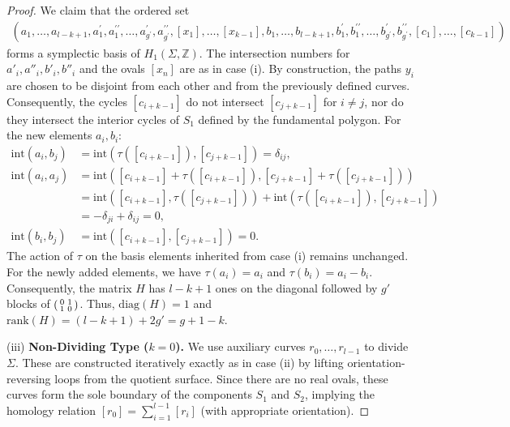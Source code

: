 \documentclass[11pt,a4paper]{article}
\theoremstyle{definition}
\newcommand{\Z}{\mathds{Z}}
\begin{document}
\begin{proof}
We claim that the ordered set
\begin{eqnarray*}
	\left(
	a_1, \ldots, a_{l-k+1}, 
	a^{\prime}_1, a^{\prime \prime}_1, \ldots, a^{\prime}_{g^{\prime}}, a^{\prime \prime}_{g^{\prime}}, 
	[x_1], \dots, [x_{k-1}], 
	b_1, \ldots, b_{l-k+1}, 
	b^{\prime}_1, b^{\prime \prime}_1, \ldots, b^{\prime}_{g^{\prime}}, b^{\prime \prime}_{g^{\prime}}, 
	[c_1], \dots, [c_{k-1}]
	\right)
\end{eqnarray*}
forms a symplectic basis of $H_1(\Sigma, \Z)$. The intersection numbers for $a'_i, a''_i, b'_i, b''_i$ and the ovals $[x_n]$ are as in case (i). By construction, the paths $y_i$ are chosen to be disjoint from each other and from the previously defined curves. Consequently, the cycles $[c_{i+k-1}]$ do not intersect $[c_{j+k-1}]$ for $i \neq j$, nor do they intersect the interior cycles of $S_1$ defined by the fundamental polygon. For the new elements $a_i, b_i$:
\begin{align*}
	\mathrm{int}(a_i, b_j) &= \mathrm{int}(\tau([c_{i+k-1}]), [c_{j+k-1}]) = \delta_{ij}, \\
	\mathrm{int}(a_i, a_j) &= \mathrm{int}([c_{i+k-1}] + \tau([c_{i+k-1}]), [c_{j+k-1}] + \tau([c_{j+k-1}])) \\
	&= \mathrm{int}([c_{i+k-1}], \tau([c_{j+k-1}])) + \mathrm{int}(\tau([c_{i+k-1}]), [c_{j+k-1}]) \\
	&= -\delta_{ji} + \delta_{ij} = 0, \\
	\mathrm{int}(b_i, b_j) &= \mathrm{int}([c_{i+k-1}], [c_{j+k-1}]) = 0.
\end{align*}
The action of $\tau$ on the basis elements inherited from case (i) remains unchanged. For the newly added elements, we have $\tau(a_i) = a_i$ and $\tau(b_i) = a_i - b_i$. Consequently, the matrix $H$ has $l-k+1$ ones on the diagonal followed by $g'$ blocks of $\begin{psmallmatrix} 0 & 1 \\ 1 & 0 \end{psmallmatrix}$. Thus, $\mathrm{diag}(H) = 1$ and $\mathrm{rank}(H) = (l-k+1) + 2g' = g + 1 - k$.

	(iii) \textbf{Non-Dividing Type ($k = 0$).} We use auxiliary curves $r_0, \ldots, r_{l-1}$ to divide $\Sigma$. These are constructed iteratively exactly as in case (ii) by lifting orientation-reversing loops from the quotient surface. Since there are no real ovals, these curves form the sole boundary of the components $S_1$ and $S_2$, implying the homology relation $[r_0] = \sum_{i=1}^{l-1} [r_i]$ (with appropriate orientation).
	

\end{proof}
\end{document}
